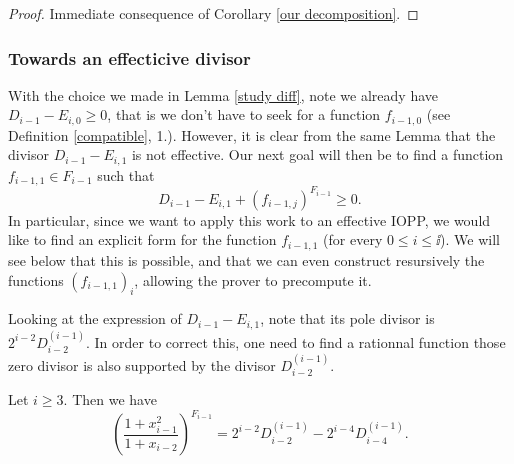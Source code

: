 \documentclass[10pt]{article}
\begin{document}
\s

\begin{proof}
Immediate consequence of Corollary \ref{our decomposition}.
\end{proof}

\s

\subsubsection{Towards an effecticive divisor}

\s

With the choice we made in Lemma \ref{study diff}, note we already have $D_{i-1}-E_{i,0} \geq 0$, that is we don't have to seek for a function $f_{i-1,0}$ (see Definition \ref{compatible}, 1.). However, it is clear from the same Lemma that the divisor $D_{i-1}-E_{i,1}$ is not effective. Our next goal will then be to find a function $f_{i-1,1} \in F_{i-1}$ such that 
\begin{equation} \label{recherche f_i}
D_{i-1} - E_{i,1} +(f_{i-1,j})^{F_{i-1}} \geq 0.
\end{equation}
In particular, since we want to apply this work to an effective IOPP, we would like to find an explicit form for the function $f_{i-1,1}$ (for every $0 \leq i \leq \ii$). We will see below that this is possible, and that we can even construct resursively the functions $(f_{i-1,1})_i$, allowing the prover to precompute it. 

\s

Looking at the expression of $D_{i-1}-E_{i,1}$, note that its pole divisor is $2^{i-2}D_{i-2}^{(i-1)}$. In order to correct this, one need to find a rationnal function those zero divisor is also supported by the divisor $D_{i-2}^{(i-1)}$.

\s


\begin{lemma} \label{f_i 1}
Let $i \geq 3$. Then we have 
\[\left(\dfrac{1+x_{i-1}^2}{1+x_{i-2}}\right)^{F_{i-1}} = 2^{i-2}D_{i-2}^{(i-1)} - 2^{i-4}D_{i-4}^{(i-1)}.\]
\end{lemma}

\s
\end{document}
